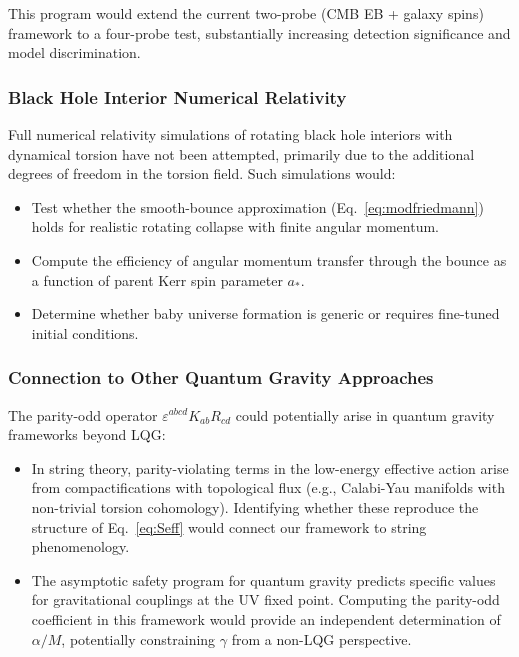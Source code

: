 \documentclass[aps,prd,twocolumn,superscriptaddress,showpacs,preprintnumbers,nofootinbib,longbibliography,floatfix]{revtex4-2}
\begin{document}
This program would extend the current two-probe (CMB EB + galaxy spins) framework to a four-probe test, substantially increasing detection significance and model discrimination.

\subsubsection{Black Hole Interior Numerical Relativity}

Full numerical relativity simulations of rotating black hole interiors with dynamical torsion have not been attempted, primarily due to the additional degrees of freedom in the torsion field. Such simulations would:

\begin{itemize}[leftmargin=*]
\item Test whether the smooth-bounce approximation (Eq.~\ref{eq:modfriedmann}) holds for realistic rotating collapse with finite angular momentum.
\item Compute the efficiency of angular momentum transfer through the bounce as a function of parent Kerr spin parameter $a_*$.
\item Determine whether baby universe formation is generic or requires fine-tuned initial conditions.
\end{itemize}

\subsubsection{Connection to Other Quantum Gravity Approaches}

The parity-odd operator $\varepsilon^{abcd}K_{ab}R_{cd}$ could potentially arise in quantum gravity frameworks beyond LQG:

\begin{itemize}[leftmargin=*]
\item In string theory, parity-violating terms in the low-energy effective action arise from compactifications with topological flux (e.g., Calabi-Yau manifolds with non-trivial torsion cohomology). Identifying whether these reproduce the structure of Eq.~\eqref{eq:Seff} would connect our framework to string phenomenology.
\item The asymptotic safety program for quantum gravity predicts specific values for gravitational couplings at the UV fixed point. Computing the parity-odd coefficient in this framework would provide an independent determination of $\alpha/M$, potentially constraining $\gamma$ from a non-LQG perspective.
\end{itemize}
\end{document}
